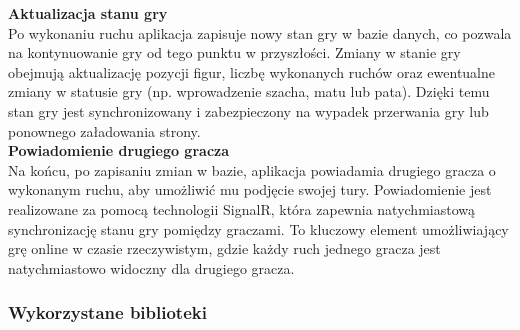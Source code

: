 \documentclass[12pt,a4paper]{article}
\begin{document}
\textbf{Aktualizacja stanu gry}\\
Po wykonaniu ruchu aplikacja zapisuje nowy stan gry w bazie danych, co pozwala na kontynuowanie gry od tego punktu w przyszłości. Zmiany w stanie gry obejmują aktualizację pozycji figur, liczbę wykonanych ruchów oraz ewentualne zmiany w statusie gry (np. wprowadzenie szacha, matu lub pata). Dzięki temu stan gry jest synchronizowany i zabezpieczony na wypadek przerwania gry lub ponownego załadowania strony.
\\

\textbf{Powiadomienie drugiego gracza}\\
Na końcu, po zapisaniu zmian w bazie, aplikacja powiadamia drugiego gracza o wykonanym ruchu, aby umożliwić mu podjęcie swojej tury. Powiadomienie jest realizowane za pomocą technologii SignalR, która zapewnia natychmiastową synchronizację stanu gry pomiędzy graczami. To kluczowy element umożliwiający grę online w czasie rzeczywistym, gdzie każdy ruch jednego gracza jest natychmiastowo widoczny dla drugiego gracza.
\\

\newpage
\subsubsection{Wykorzystane biblioteki}
\end{document}
